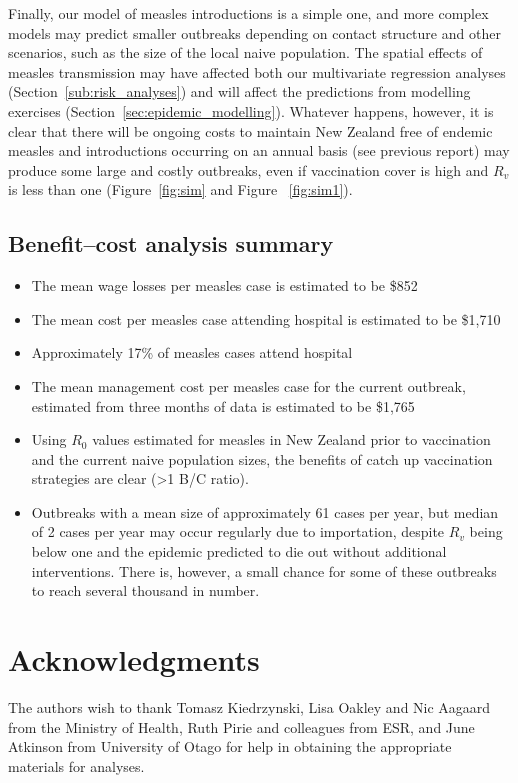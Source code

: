 \documentclass{article}
\begin{document}
Finally, our model of measles introductions is a simple one, and more complex models may predict smaller outbreaks depending on contact structure and other scenarios, such as the size of the local naive population. The spatial effects of measles transmission may have affected both our multivariate regression analyses (Section~\ref{sub:risk_analyses}) and will affect the predictions from modelling exercises (Section~\ref{sec:epidemic_modelling}). Whatever happens, however, it is clear that there will be ongoing costs to maintain New Zealand free of endemic measles and introductions occurring on an annual basis (see previous report) may produce some large and costly outbreaks, even if vaccination cover is high and $R_v$ is less than one (Figure~\ref{fig:sim} and Figure ~\ref{fig:sim1}).

\subsection{Benefit--cost analysis summary}
\begin{itemize}
\item The mean wage losses per measles case is estimated to be \$852
\item The mean cost per measles case attending hospital is estimated to be \$1,710
\item Approximately 17\% of measles cases attend hospital
\item The mean management cost per measles case for the current outbreak, estimated from three months of data is estimated to be \$1,765
\item Using $R_0$ values estimated for measles in New Zealand prior to vaccination and the current naive population sizes, the benefits of catch up vaccination strategies are clear (>1 B/C ratio).
\item Outbreaks with a mean size of approximately 61 cases per year, but median of 2 cases per year may occur regularly due to importation, despite $R_v$ being below one and the epidemic predicted to die out without additional interventions. There is, however, a small chance for some of these outbreaks to reach several thousand in number.
\end{itemize}

\section{Acknowledgments}
The authors wish to thank Tomasz Kiedrzynski, Lisa Oakley and Nic Aagaard from the Ministry of Health, Ruth Pirie and colleagues from ESR, and June Atkinson from University of Otago for help in obtaining the appropriate materials for analyses.
\end{document}
